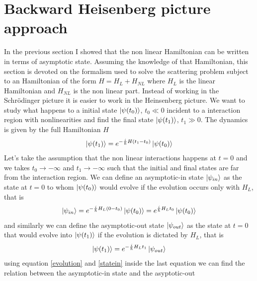\documentclass[12pt]{book}
\begin{document}
\section{Backward Heisenberg picture approach}\label{heinsemberg}
In the previous section I showed that the non linear Hamiltonian can be written in terms of asymptotic state. Assuming the knowledge of that Hamiltonian, this section is devoted on the formalism used to solve the scattering problem subject to an Hamiltonian of the form $H = H_L +H_{NL}$ where $H_L$ is the linear Hamiltonian and $H_{NL}$ is the non linear part. Instead of working in the Schr{\"o}dinger picture it is easier to work in the Heinsenberg picture. 
We want to study what happens to a initial state $\ket{\psi(t_0)}$, $t_0\ll 0$ incident to a interaction region with nonlinearities and find the final state $\ket{\psi(t_1)}$, $t_1\gg 0$. The dynamics is given by the full Hamiltonian $H$
\begin{equation}\label{evolution}\ket{\psi(t_1)} = e^{-\frac{i}{\hbar}H (t_1-t_0)}\ket{\psi(t_0)}\end{equation}
Let's take the assumption that the non linear interactions happens at $t=0$ and we takes $t_0 \to -\infty$ and $t_1 \to -\infty$ such that the initial and final states are far from the interaction region. We can define an asymptotic-in state $\ket{\psi_{in}}$ as the state at $t=0$ to whom $\ket{\psi(t_0)}$ would evolve if the evolution occurs only with $H_L$, that is
\begin{equation}\label{statein}\ket{\psi_{in}} = e^{-\frac{i}{\hbar}H_L (0-t_0)}\ket{\psi(t_0)} = e^{\frac{i}{\hbar}H_Lt_0}\ket{\psi(t_0)}\end{equation}
and similarly we can define the asymptotic-out state $\ket{\psi_{out}}$ as the state at $t=0$ that would evolve into $\ket{\psi(t_1)}$ if the evolution is dictated by $H_L$, that is
\begin{equation}\ket{\psi(t_1)} = e^{-\frac{i}{\hbar}H_L t_1}\ket{\psi_{out}}\end{equation}
using equation \eqref{evolution} and \eqref{statein} inside the last equation we can find the relation between the asymptotic-in state and the asyptotic-out
\end{document}
